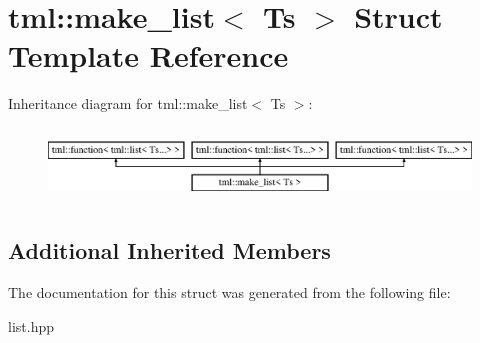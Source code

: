 \hypertarget{structtml_1_1make__list}{\section{tml\+:\+:make\+\_\+list$<$ Ts $>$ Struct Template Reference}
\label{structtml_1_1make__list}
}
Inheritance diagram for tml\+:\+:make\+\_\+list$<$ Ts $>$\+:\begin{figure}[H]
\begin{center}
\leavevmode
\includegraphics[height=1.964912cm]{structtml_1_1make__list}
\end{center}
\end{figure}
\subsection*{Additional Inherited Members}


The documentation for this struct was generated from the following file\+:\begin{DoxyCompactItemize}
\item 
list.\+hpp\end{DoxyCompactItemize}
